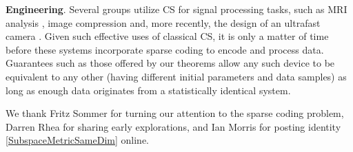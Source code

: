 \documentclass[journal, twocolumn]{IEEEtran}
\begin{document}
\textbf{Engineering}.
Several groups utilize CS for signal processing tasks, such as MRI analysis \cite{lustig2008compressed},  image compression \cite{Duarte08}  and, more recently, the design of an ultrafast camera \cite{Gao14}. Given such effective uses of classical CS, it is only a matter of time before these systems incorporate sparse coding to encode and process data. Guarantees such as those offered by our theorems allow any such device to be equivalent to any other (having different initial parameters and data samples) as long as enough data originates from a statistically identical system.


We thank Fritz Sommer for turning our attention to the sparse coding problem, Darren Rhea for sharing early explorations, and Ian Morris for posting identity \eqref{SubspaceMetricSameDim} online.  








\end{document}
